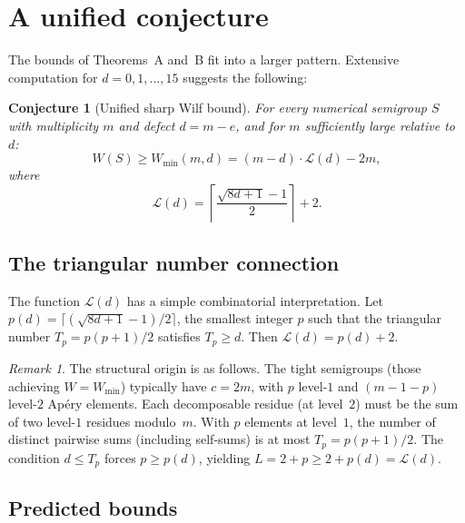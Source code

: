 \documentclass[11pt]{amsart}
\newtheorem{conjecture}[theorem]{Conjecture}
\theoremstyle{definition}
\theoremstyle{remark}
\newtheorem{remark}[theorem]{Remark}
\begin{document}
\section{A unified conjecture}\label{sec:conjecture}

The bounds of Theorems~A and~B fit into a larger pattern.
Extensive computation for $d = 0, 1, \ldots, 15$ suggests the following:

\begin{conjecture}[Unified sharp Wilf bound]\label{conj:unified}
For every numerical semigroup $S$ with multiplicity $m$ and defect $d = m - e$,
and for $m$ sufficiently large relative to $d$:
\begin{equation}\label{eq:unified}
  W(S) \ge W_{\min}(m, d) = (m - d) \cdot \mathcal{L}(d) - 2m,
\end{equation}
where
\begin{equation}\label{eq:L-function}
  \mathcal{L}(d) = \left\lceil \frac{\sqrt{8d + 1} - 1}{2} \right\rceil + 2.
\end{equation}
\end{conjecture}

\subsection{The triangular number connection}

The function $\mathcal{L}(d)$ has a simple combinatorial interpretation.
Let $p(d) = \lceil (\sqrt{8d+1} - 1)/2 \rceil$, the smallest integer $p$
such that the triangular number $T_p = p(p+1)/2$ satisfies $T_p \ge d$.
Then $\mathcal{L}(d) = p(d) + 2$.

\begin{remark}
The structural origin is as follows.  The tight semigroups (those achieving
$W = W_{\min}$) typically have $c = 2m$, with $p$ level-$1$ and $(m - 1 - p)$
level-$2$ Ap\'ery elements.  Each decomposable residue (at level~$2$) must be the
sum of two level-$1$ residues modulo~$m$.
With $p$ elements at level~$1$, the number of distinct pairwise sums
(including self-sums) is at most $T_p = p(p+1)/2$.
The condition $d \le T_p$ forces $p \ge p(d)$, yielding
$L = 2 + p \ge 2 + p(d) = \mathcal{L}(d)$.
\end{remark}

\subsection{Predicted bounds}
\end{document}
